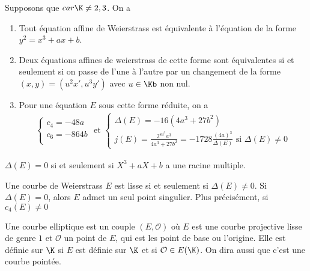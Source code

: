         \begin{prop}
            Supposons que $car \K \neq 2,3$. On a
            \begin{enumerate}
                \item Tout équation affine de Weierstrass est équivalente à l'équation de la forme $y^2 = x^3 + ax + b$.
                \item Deux équations affines de weierstrass de cette forme sont équivalentes si et seulement si on passe de l'une à l'autre par un changement de la forme $(x,y) = (u^2x', u^3y')$ avec $u \in \Kb$ non nul.
                \item Pour une équation $E$ sous cette forme réduite, on a
                \begin{align*}
                    \begin{cases}
                        c_4 = -48a \\
                        c_6 = -864b \\
                    \end{cases}
                    \text{ et }
                    \begin{cases}
                        \Delta(E) = -16(4a^3 + 27b^2) \\
                        j(E) = \frac{2^83^3a^3}{4a^3 + 27b^2} = -1728\frac{(4a)^3}{\Delta(E)} \text{ si } \Delta(E) \neq 0
                    \end{cases}
                \end{align*}
            \end{enumerate}
        \end{prop}
        \begin{remq}
            $\Delta(E) = 0$ si et seulement si $X^3 + aX + b$ a une racine multiple.
        \end{remq}
        \begin{prop}
            Une courbe de Weierstrass $E$ est lisse si et seulement si $\Delta(E) \neq 0$. Si $\Delta(E) = 0$, alors $E$ admet un seul point singulier. Plus précisément, si $c_4(E) \neq 0$ 
        \end{prop}
        \begin{defi}
            Une courbe elliptique est un couple $(E, \mathcal{O})$ où $E$ est une courbe projective lisse de genre $1$ et $\mathcal{O}$ un point de $E$, qui est les point de base ou l'origine. Elle est définie sur $\K$ si $E$ est définie sur $\K$ et si $\mathcal{O} \in E(\K)$. On dira aussi que c'est une courbe pointée.
        \end{defi}
